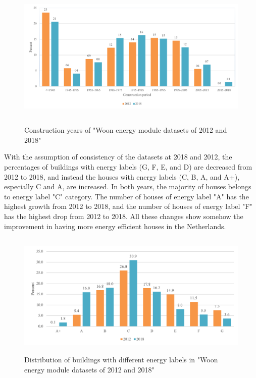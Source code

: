 \documentclass[preprint,12pt,3p]{elsarticle}
\begin{document}
\begin{figure}[H]
    \centering
    \includegraphics[width=14cm, height=7cm, clip, trim=4 4 4 4, clip]{constructionyear.PNG}
    \caption{Construction years of "Woon energy module datasets of 2012 and 2018"}
    \label{fig:3}
\end{figure}


With the assumption of consistency of the datasets at 2018 and 2012, the percentages of buildings with energy labels (G, F, E, and D) are decreased from 2012 to 2018, and instead the houses with energy labels (C, B, A, and A+), especially C and A, are increased. In both years, the majority of houses belongs to energy label "C" category. The number of houses of energy label "A" has the highest growth from 2012 to 2018, and the number of houses of energy label "F" has the highest drop from 2012 to 2018. All these changes show somehow the improvement in having more energy efficient houses in the Netherlands.

\begin{figure}[H]
    \centering
    \includegraphics[width=15cm, height=6cm, clip, trim=4 4 4 4, clip]{Plabel.png}
    \caption{Distribution of buildings with different energy labels in "Woon energy module datasets of 2012 and 2018"}
    \label{fig:4}
\end{figure}
\end{document}
